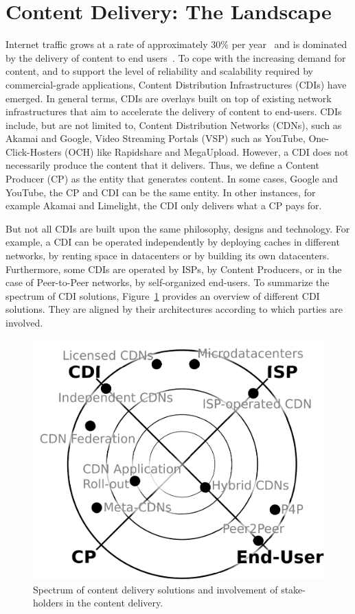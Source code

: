 \section{Content Delivery: The Landscape}\label{sec:content-delivery}

Internet traffic grows at a rate of approximately 30\% per
year~\cite{cisco-study} and is dominated by the delivery of content to end
users~\cite{IXPSIGCOMM2012,TrafficTypesGrowth:2011,arbor,PADIS2010}. To cope
with the increasing demand for content, and to support the level of reliability
and scalability required by commercial-grade applications, Content Distribution
Infrastructures (CDIs) have emerged. In general terms, CDIs are overlays built
on top of existing network infrastructures that aim to accelerate the delivery
of content to end-users. CDIs include, but are not limited to, Content
Distribution Networks (CDNs), such as Akamai and Google, Video Streaming
Portals (VSP) such as YouTube, One-Click-Hosters (OCH) like Rapidshare and
MegaUpload. However, a CDI does not necessarily produce the content that it
delivers. Thus, we define a Content Producer (CP) as the entity that generates
content. In some cases, \eg Google and YouTube, the CP and CDI can be the same
entity. In other instances, for example Akamai and Limelight, the CDI only
delivers what a CP pays for.

But not all CDIs are built upon the same philosophy, designs and technology.
For example, a CDI can be operated independently by deploying caches in
different networks, by renting space in datacenters or by building its own
datacenters. Furthermore, some CDIs are operated by ISPs, by Content Producers,
or in the case of Peer-to-Peer networks, by self-organized end-users. To
summarize the spectrum of CDI solutions, Figure~\ref{fig:cdn-spectrum} provides
an overview of different CDI solutions. They are aligned by their architectures
according to which parties are involved.

\begin{figure}[tbp]
    \begin{center}
    \includegraphics[width=0.7\linewidth]{figures-pdf/spectrum}
    \end{center}
    \caption{Spectrum of content delivery solutions and involvement of stake-holders in the content delivery.}
    \label{fig:cdn-spectrum}
\end{figure}

